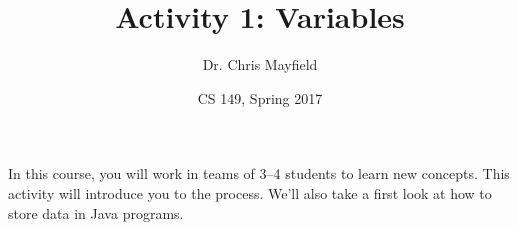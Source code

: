 \documentclass[12pt]{article}
\title{Activity 1: Variables}
\author{Dr. Chris Mayfield}
\date{CS 149, Spring 2017}
\begin{document}
\maketitle

In this course, you will work in teams of 3--4 students to learn new concepts.
This activity will introduce you to the process.
We'll also take a first look at how to store data in Java programs.





\end{document}
